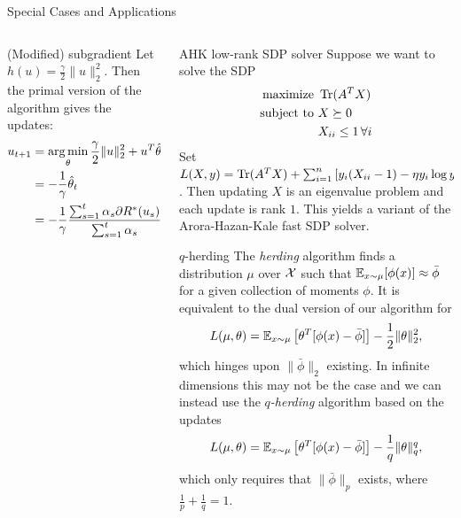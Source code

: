 \documentclass[final]{beamer}
\begin{document}
\begin{frame}{}
\begin{columns}
\begin{column}{0.50\linewidth}
\begin{block}{\large Special Cases and Applications}
\begin{columns}[t]
\begin{column}{0.47\linewidth}
\begin{block}{(Modified) subgradient}
Let $h(u) = \frac{\gamma}{2} \|u\|_2^2$. Then the primal version of the 
algorithm gives the updates:
\begin{align*}
u_{t+1} &= \argmin_{\theta} \frac{\gamma}{2}\|u\|_2^2 + u^T\hat{\theta}_t \\
 &= -\frac{1}{\gamma}\hat{\theta}_t \\
 &= -\frac{1}{\gamma} \frac{\sum_{s=1}^t \alpha_s \partial R^*(u_s)}{\sum_{s=1}^t \alpha_s}.
\end{align*}
\end{block}

\end{column}
\begin{column}{0.47\linewidth}
\begin{block}{AHK low-rank SDP solver}
Suppose we want to solve the SDP
\begin{align*}
\text{maximize }   & \operatorname{Tr}(A^TX) \\
\text{subject to } & X \succeq 0 \\
                  & X_{ii} \leq 1 \, \forall i
\end{align*}
Set \small{$L(X,y) = \operatorname{Tr}(A^TX) + \sum_{i=1}^n \left[y_i(X_{ii}-1) - \eta y_i\log y_i\right]$}.
Then updating $X$ is an eigenvalue problem and each update is rank $1$. This 
yields a variant of the Arora-Hazan-Kale fast SDP solver.
\end{block}

\begin{block}{$q$-herding}
The \emph{herding} algorithm finds a distribution $\mu$ over 
$\mathcal{X}$ such that $\mathbb{E}_{x \sim \mu}[\phi(x)] \approx \bar{\phi}$ 
for a given collection of moments $\phi$. It is equivalent to 
the dual version of our algorithm for
\[ L(\mu,\theta) = \mathbb{E}_{x \sim \mu}\left[\theta^T[\phi(x)-\bar{\phi}]\right] - \frac{1}{2}\|\theta\|_2^2, \]
which hinges upon $\|\bar{\phi}\|_2$ existing. In infinite 
dimensions this may not be the case and we can instead use the 
\emph{$q$-herding} algorithm based on the updates
\[ L(\mu,\theta) = \mathbb{E}_{x \sim \mu}\left[\theta^T[\phi(x)-\bar{\phi}]\right] - \frac{1}{q}\|\theta\|_q^q, \]
which only requires that $\|\bar{\phi}\|_p$ exists, where $\frac{1}{p} + \frac{1}{q} = 1$.
\end{block}

\end{column}
\end{columns}
\vspace{-3 mm}
\end{block}


\end{column}
\end{columns}
\end{frame}
\end{document}
